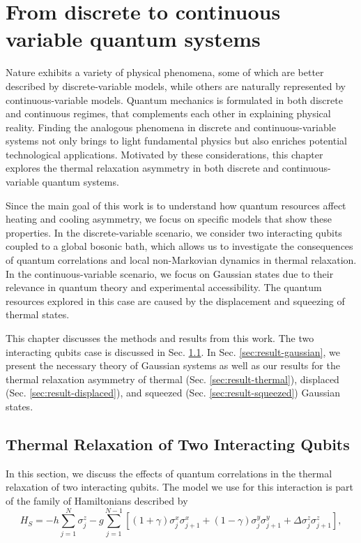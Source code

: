 
\chapter{From discrete to continuous variable quantum systems}\label{cap:results}

Nature exhibits a variety of physical phenomena, some of which are better described by discrete-variable models, while others are naturally represented by continuous-variable models. Quantum mechanics is formulated in both discrete and continuous regimes, that complements each other in explaining physical reality. Finding the analogous phenomena in discrete and continuous-variable systems not only brings to light fundamental physics but also enriches potential technological applications. Motivated by these considerations, this chapter explores the thermal relaxation asymmetry in both discrete and continuous-variable quantum systems.

Since the main goal of this work is to understand how quantum resources affect heating and cooling asymmetry, we focus on specific models that show these properties. In the discrete-variable scenario, we consider two interacting qubits coupled to a global bosonic bath, which allows us to investigate the consequences of quantum correlations and local non-Markovian dynamics in thermal relaxation. In the continuous-variable scenario, we focus on Gaussian states due to their relevance in quantum theory and experimental accessibility. The quantum resources explored in this case are caused by the displacement and squeezing of thermal states.

This chapter discusses the methods and results from this work. The two interacting qubits case is discussed in Sec. \ref{sec:qubits}. In Sec. \ref{sec:result-gaussian}, we present the necessary theory of Gaussian systems as well as our results for the thermal relaxation asymmetry of thermal (Sec. \ref{sec:result-thermal}), displaced (Sec. \ref{sec:result-displaced}), and squeezed (Sec. \ref{sec:result-squeezed}) Gaussian states.




\section{Thermal Relaxation of Two Interacting Qubits}\label{sec:qubits}

In this section, we discuss the effects of quantum correlations in the thermal relaxation of two interacting qubits. The model we use for this interaction is part of the family of Hamiltonians described by
\begin{equation}
    H_S = - h \sum_{j=1}^{N} \sigma_{j}^{z} - g \sum_{j=1}^{N-1} [(1+\gamma) \sigma_{j}^{x} \sigma_{j+1}^{x} + (1-\gamma) \sigma_{j}^{y} \sigma_{j+1}^{y} + \Delta \sigma_{j}^{z} \sigma_{j+1}^{z} ],
    \label{eq:HS-qubit}
\end{equation}

